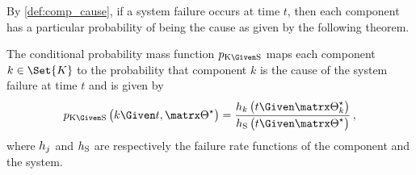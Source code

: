 \documentclass[../main.tex]{subfiles}
\begin{document}
By \cref{def:comp_cause}, if a system failure occurs at time $t$, then each component has a particular probability of being the cause as given by the following theorem.
\begin{theorem}
\label{def:general_cond_prob}
The conditional probability mass function $\pmf_{\RV{K} \Given \sv}$ maps each component $k \in \Set{K}$ to the probability that 
component $k$ is the cause of the system failure at time $t$ and is given by
\begin{equation}
\label{eq:general_cond_prob_failure_rate}
    \pmf_{\RV{K} \Given \sv}\left(k \Given t, \tparam{\sysparam}\right) = \frac{\haz_k\left(t \Given \tparam{\sysparam}_k\right)}{\haz_{\sv}\left(t \Given \tparam{\sysparam}\right)}\,,
\end{equation}
where $h_j$ and $h_{\mathrm{S}}$ are respectively the failure rate functions of 
the \jth component and the system.
\end{theorem}
\end{document}
